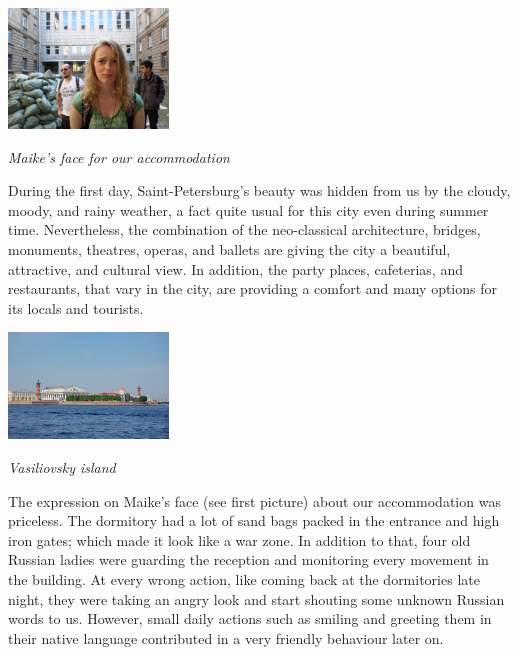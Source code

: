 \documentclass[10pt,a4paper]{article} %
\begin{document}
\begin{multicols}{3}
\begin{center}
	\includegraphics[width=0.32\textwidth]{media/accommodation_in_spb.jpg}
	\par\textit{Maike's face for our accommodation}
\end{center}


During the first day, Saint-Petersburg's beauty was hidden from us by the cloudy, 
moody, and rainy weather, a fact quite usual for this city even during summer time.  
Nevertheless, the combination of the neo-classical architecture, bridges, monuments, 
theatres, operas, and ballets are giving the city a beautiful, attractive, 
and cultural view. 
In addition, the party places, cafeterias, and restaurants, that vary in the 
city, are providing a comfort and many options for its locals and tourists. 


\begin{center}
	\includegraphics[width=0.32\textwidth]{media/spb_1.jpg}
	\par\textit{Vasiliovsky island}
\end{center}

The expression on Maike's face (see first picture) about our accommodation was 
priceless. 
The dormitory had a lot of sand bags packed in the entrance and high iron gates; 
which made it look like a war zone.  
In addition to that, four old Russian ladies were guarding the reception and 
monitoring every movement in the building. 
At every wrong action, like coming back at the dormitories late night, they 
were taking an angry look and start shouting some unknown Russian words to us. 
However, small daily actions such as smiling and greeting them in their native 
language contributed in a very friendly behaviour later on.



\end{multicols}
\end{document}
